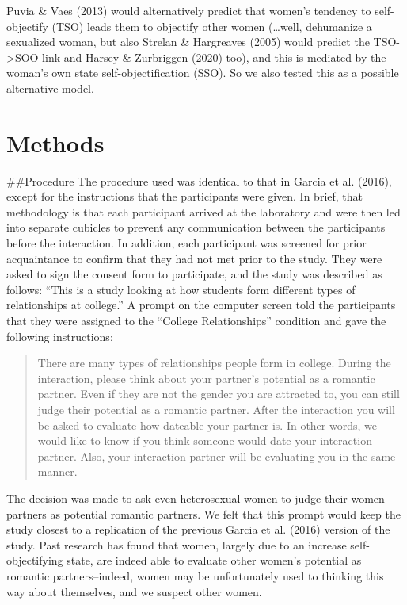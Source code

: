 \documentclass[
  man]{apa6}
\begin{document}
Puvia \& Vaes (2013) would alternatively predict that women's tendency to self-objectify (TSO) leads them to objectify other women (\ldots well, dehumanize a sexualized woman, but also Strelan \& Hargreaves (2005) would predict the TSO-\textgreater SOO link and Harsey \& Zurbriggen (2020) too), and this is mediated by the woman's own state self-objectification (SSO). So we also tested this as a possible alternative model.

\hypertarget{methods}{%
\section{Methods}\label{methods}}

\#\#Procedure
The procedure used was identical to that in Garcia et al. (2016), except for the instructions that the participants were given. In brief, that methodology is that each participant arrived at the laboratory and were then led into separate cubicles to prevent any communication between the participants before the interaction. In addition, each participant was screened for prior acquaintance to confirm that they had not met prior to the study. They were asked to sign the consent form to participate, and the study was described as follows: \enquote{This is a study looking at how students form different types of relationships at college.} A prompt on the computer screen told the participants that they were assigned to the \enquote{College Relationships} condition and gave the following instructions:

\begin{quote}
There are many types of relationships people form in college. During the interaction, please think about your partner's potential as a romantic partner. Even if they are not the gender you are attracted to, you can still judge their potential as a romantic partner. After the interaction you will be asked to evaluate how dateable your partner is. In other words, we would like to know if you think someone would date your interaction partner. Also, your interaction partner will be evaluating you in the same manner.
\end{quote}

The decision was made to ask even heterosexual women to judge their women partners as potential romantic partners. We felt that this prompt would keep the study closest to a replication of the previous Garcia et al. (2016) version of the study. Past research has found that women, largely due to an increase self-objectifying state, are indeed able to evaluate other women's potential as romantic partners--indeed, women may be unfortunately used to thinking this way about themselves, and we suspect other women.
\end{document}
